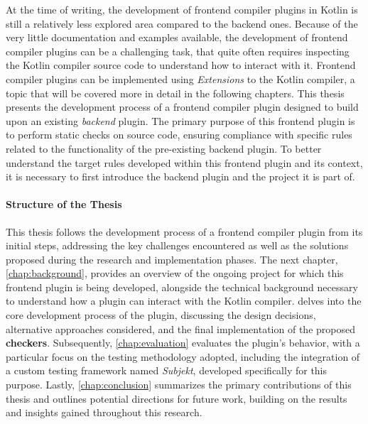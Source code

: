 \documentclass[12pt,a4paper,openright,twoside]{book}
\begin{document}
At the time of writing, the development of frontend compiler plugins in Kotlin is
still a relatively less explored area compared to the backend ones. Because of the 
very little documentation and examples available, the development of frontend 
compiler plugins can be a challenging task, that quite often requires inspecting 
the Kotlin compiler source code to understand how to interact with it.
%
Frontend compiler plugins can be implemented using \textit{Extensions} to the
Kotlin compiler, a topic that will be covered more in detail in the following
chapters. This thesis presents the development process of a frontend compiler
plugin designed to build upon an existing \textit{backend} plugin. The primary
purpose of this frontend plugin is to perform static checks on source code,
ensuring compliance with specific rules related to the functionality of the
pre-existing backend plugin. To better understand the target rules developed
within this frontend plugin and its context, it is necessary to first introduce 
the backend plugin and the project it is part of.

\paragraph{Structure of the Thesis}

This thesis follows the development process of a frontend compiler plugin from
its initial steps, addressing the key challenges encountered as well as the
solutions proposed during the research and implementation phases. The next
chapter, \cref{chap:background}, provides an overview of the ongoing project for
which this frontend plugin is being developed, alongside the technical
background necessary to understand how a plugin can interact with the Kotlin
compiler.
%
 delves into the core development process of the plugin,
discussing the design decisions, alternative approaches considered, and the
final implementation of the proposed \textbf{checkers}. Subsequently,
\cref{chap:evaluation} evaluates the plugin’s behavior, with a particular focus
on the testing methodology adopted, including the integration of a custom
testing framework named \emph{Subjekt}, developed specifically for this purpose.
%
Lastly, \cref{chap:conclusion} summarizes the primary contributions of this
thesis and outlines potential directions for future work, building on the
results and insights gained throughout this research.

\end{document}

